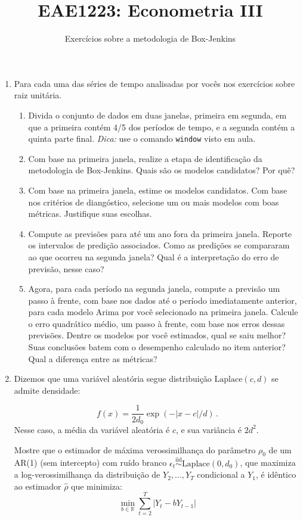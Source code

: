 \documentclass[10pt,a4paper]{article}
\title{\large EAE1223: Econometria III}
\author{\normalsize Exercícios sobre a metodologia de Box-Jenkins}
\date{}
\begin{document}
	\maketitle
	\begin{enumerate}
\item Para cada uma das séries de tempo analisadas por vocês nos exercícios sobre raiz unitária.
\begin{enumerate}
	\item Divida o conjunto de dados em duas janelas, primeira em segunda, em que a primeira contém 4/5 dos períodos de tempo, e a segunda contém a quinta parte final. \textit{Dica:} use o comando \texttt{window} visto em aula.
	\item Com base na primeira janela, realize a etapa de identificação da metodologia de Box-Jenkins. Quais são os modelos candidatos? Por quê?
	\item Com base na primeira janela, estime os modelos candidatos. Com base nos critérios de diangóstico, selecione um ou mais modelos com boas métricas. Justifique suas escolhas.
	\item Compute as previsões para até um ano fora da primeira janela. Reporte os intervalos de predição associados. Como as predições se compararam ao que ocorreu na segunda janela? Qual é a interpretação do erro de previsão, nesse caso?
	\item Agora, para cada período na segunda janela, compute a previsão um passo à frente, com base nos dados até o período imediatamente anterior, para cada modelo Arima por você selecionado na primeira janela. Calcule o erro quadrático médio, um passo à frente, com base nos erros dessas previsões. Dentre os modelos por você estimados, qual se saiu melhor? Suas conclusões batem com o desempenho calculado no item anterior? Qual a diferença entre as métricas?
\end{enumerate}

		\item Dizemos que uma variável aleatória segue distribuição $\text{Laplace}(c,d)$ se admite densidade:

	$$f(x) = \frac{1}{2d_0}\exp(-|x-c|/d) \, .$$
	Nesse caso, a média da variável aleatória é $c$, e sua variância é $2d^2$.

	 Mostre que o estimador de máxima verossimilhança do parâmetro $\rho_0$ de um AR(1) (sem intercepto) com ruído branco $\epsilon_t \overset{\text{iid}}{\sim}\text{Laplace}(0,d_0)$, que maximiza a log-verossimilhança da distribuição de $Y_2,\ldots, Y_T$ condicional a $Y_1$, é idêntico ao estimador $\hat \rho$ que minimiza:
	$$\min_{b \in \mathbb{R}}\sum_{t=2}^T |Y_t - b Y_{t-1}|$$
\end{enumerate}
\end{document}
